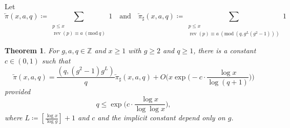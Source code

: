 \documentclass[hidelinks]{amsart}
\numberwithin{equation}{section}
\theoremstyle{plain}
\newtheorem{theorem}{Theorem}
\theoremstyle{definition}
\renewcommand{\mod}[1]{(\mathrm{mod}\ #1)}
\DeclareMathOperator{\rev}{rev}
\begin{document}
Let
\begin{equation}
\overleftarrow{\pi}(x,a,q)
\coloneqq
\sum_{\substack{
p\le x\\
\rev(p)\equiv a\ \mod{q}
}}
1
\quad\text{and}\quad
\overleftarrow{\pi}\!_{\sharp}(x,a,q)
\coloneqq
\sum_{\substack{
p\le x\\
\rev(p)\equiv a\ \mod{(q,g^{L}(g^{2}-1))}
}}
1
\end{equation}

\begin{theorem}
\label{thm:Zsiflaw_Legeis_pure}
For $g,a,q\in\mathbb{Z}$ and $x\ge1$ with $g\ge2$ and $q\ge1$, there is a constant $c\in(0,1)$ such that
\[
\overleftarrow{\pi}(x,a,q)
=
\frac{(q,(g^{2}-1)g^{L})}{q}
\overleftarrow{\pi}\!_{\sharp}(x,a,q)
+
O\biggl(x\exp\biggl(-c\cdot\frac{\log x}{\log(q+1)}\biggr)\biggr)
\]
provided
\begin{equation}
\label{thm:Zsiflaw_Legeis_pure:q_range}
q\le\exp\biggl(c\cdot\frac{\log x}{\log\log x}\biggr),
\end{equation}
where $L\coloneqq[\frac{\log x}{\log g}]+1$
and $c$ and the implicit constant depend only on $g$.
\end{theorem}
\end{document}
